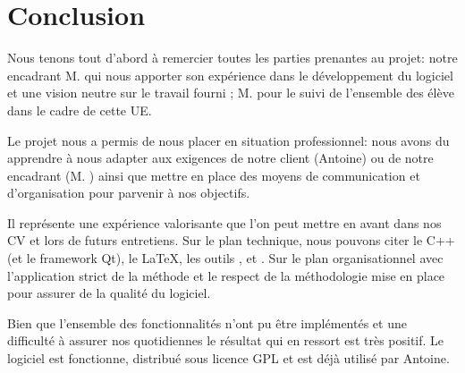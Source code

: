 \chapter*{Conclusion}
Nous tenons tout d'abord à remercier toutes les parties prenantes au projet: notre encadrant M.  qui nous apporter son expérience dans le développement du logiciel et une vision neutre sur le travail fourni ; M.  pour le suivi de l'ensemble des élève dans le cadre de cette UE. 

Le projet \FactDev{} nous a permis de nous placer en situation professionnel: nous avons du apprendre à nous adapter aux exigences de notre client (Antoine) ou de notre encadrant (M. ) ainsi que mettre en place des moyens de communication et d'organisation pour parvenir à nos objectifs. 

Il représente une expérience valorisante que l'on peut mettre en avant dans nos CV et lors de futurs entretiens. Sur le plan technique, nous pouvons citer le C++ (et le framework Qt), le \LaTeX, les outils \Travis{}, \Github{} et \Coveralls. Sur le plan organisationnel avec l'application strict de la méthode \Scrum{} et le respect de la méthodologie mise en place pour assurer de la qualité du logiciel. 

Bien que l'ensemble des fonctionnalités n'ont pu être implémentés et une difficulté à assurer nos \Melees{} quotidiennes le résultat qui en ressort est très positif. Le logiciel \FactDev{} est fonctionne, distribué sous licence GPL et est déjà utilisé par Antoine. 